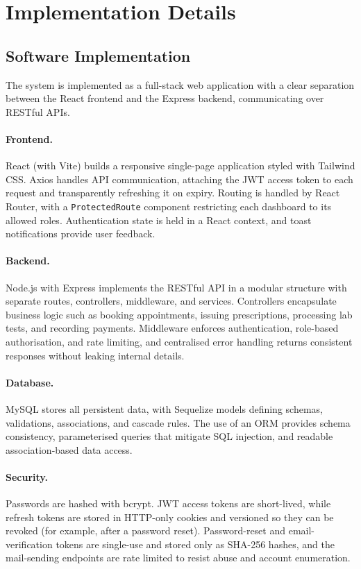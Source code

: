\documentclass[12pt,a4paper]{report}
\begin{document}
\section{Implementation Details}

\subsection{Software Implementation}
The system is implemented as a full-stack web application with a clear separation
between the React frontend and the Express backend, communicating over RESTful APIs.

\paragraph{Frontend.} React (with Vite) builds a responsive single-page application
styled with Tailwind CSS. Axios handles API communication, attaching the JWT access
token to each request and transparently refreshing it on expiry. Routing is handled by
React Router, with a \texttt{ProtectedRoute} component restricting each dashboard to its
allowed roles. Authentication state is held in a React context, and toast notifications
provide user feedback.

\paragraph{Backend.} Node.js with Express implements the RESTful API in a modular
structure with separate routes, controllers, middleware, and services. Controllers
encapsulate business logic such as booking appointments, issuing prescriptions,
processing lab tests, and recording payments. Middleware enforces authentication,
role-based authorisation, and rate limiting, and centralised error handling returns
consistent responses without leaking internal details.

\paragraph{Database.} MySQL stores all persistent data, with Sequelize models defining
schemas, validations, associations, and cascade rules. The use of an ORM provides schema
consistency, parameterised queries that mitigate SQL injection, and readable
association-based data access.

\paragraph{Security.} Passwords are hashed with bcrypt. JWT access tokens are
short-lived, while refresh tokens are stored in HTTP-only cookies and versioned so they
can be revoked (for example, after a password reset). Password-reset and
email-verification tokens are single-use and stored only as SHA-256 hashes, and the
mail-sending endpoints are rate limited to resist abuse and account enumeration.
\end{document}
